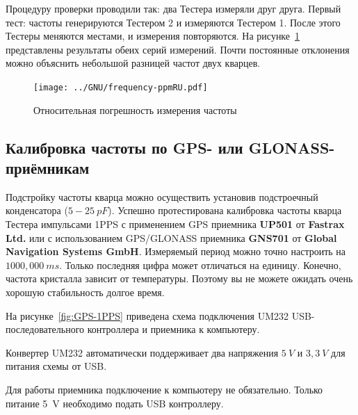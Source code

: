 Процедуру проверки проводили так: два Тестера измеряли друг друга. Первый тест: частоты генерируются 
Тестером 2 и измеряются Тестером 1. После этого Тестеры меняются местами, и измерения повторяются. 
На рисунке~\ref{fig:freq-ppm} представлены результаты обеих серий измерений. Почти постоянные 
отклонения можно объяснить небольшой разницей частот двух кварцев.

\begin{figure}[H]
\centering
\texttt{[image: ../GNU/frequency-ppmRU.pdf]}
\caption{Относительная погрешность измерения частоты}
\label{fig:freq-ppm}
\end{figure}

\subsection{Калибровка частоты по GPS- или GLONASS-приёмникам}

Подстройку частоты кварца можно осуществить установив подстроечный конденсатора (\(5-25~pF\)).
Успешно протестирована калибровка частоты кварца Тестера импульсами 1PPS с применением GPS приемника 
\textbf{ UP501} от \textbf{ Fastrax Ltd.} или с использованием GPS/GLONASS приемника \textbf{ GNS701} от \textbf{ Global 
Navigation Systems GmbH}.
Измеряемый период можно точно настроить на \(1000,000~ms\).
Только последняя цифра может отличаться на единицу.
Конечно, частота кристалла зависит от температуры. Поэтому вы не можете ожидать очень хорошую стабильность 
долгое время.

На рисунке~\ref{fig:GPS-1PPS} приведена схема подключения UM232 USB-последовательного контроллера и
приемника к компьютеру.

Конвертер UM232 автоматически поддерживает два напряжения \(5~V\) и \(3,3~V\) 
для питания схемы от USB. 

Для работы приемника подключение к компьютеру не обязательно. 
Только питание 5~V необходимо подать USB контроллеру. 

